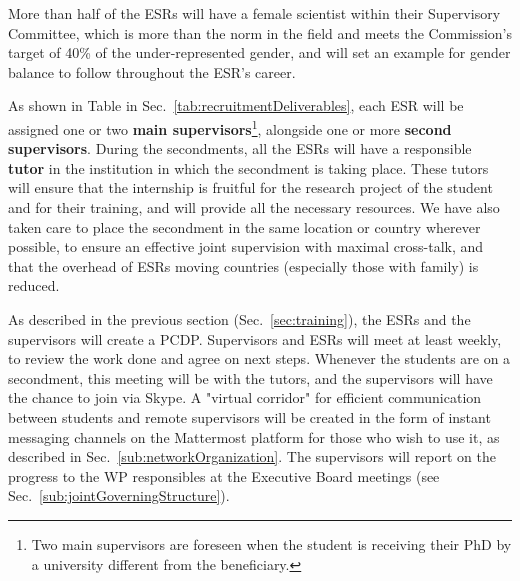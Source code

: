 More than half of the ESRs will have a female scientist within their Supervisory Committee, which is more than the norm in the field and meets the Commission's target of 40\% of the under-represented gender, and will set an example for gender balance to follow throughout the ESR's career.

As shown in Table in Sec.~\ref{tab:recruitmentDeliverables},
each ESR will be assigned one or two \textbf{main supervisors}\footnote{Two main supervisors are foreseen when the student is receiving their PhD by a university different from the beneficiary.}, alongside one or more \textbf{second supervisors}. 
During the secondments, all the ESRs will have a responsible \textbf{tutor} in the institution in which the secondment is taking place. These tutors will ensure that the internship is fruitful for the research project of the student and for their training, and will provide all the necessary
resources. 
We have also taken care to place the secondment in the same location or country wherever possible, to ensure an effective joint supervision 
with maximal cross-talk, and that the overhead of ESRs moving countries (especially those with family) is reduced. 

As described in the previous section (Sec.~\ref{sec:training}), the ESRs and the supervisors will create a PCDP. 
Supervisors and ESRs will meet at least weekly, to review the work done and agree on next steps. 
Whenever the students are on a secondment, this meeting will be with the tutors, and the supervisors will have the chance to join via Skype. 
A "virtual corridor" for efficient communication between students and remote supervisors will be created in the form of instant messaging channels on the Mattermost platform for those who wish to use it, as described in Sec.~\ref{sub:networkOrganization}. 
The supervisors will report on the progress to the WP responsibles at the Executive Board meetings (see Sec.~\ref{sub:jointGoverningStructure}). 

